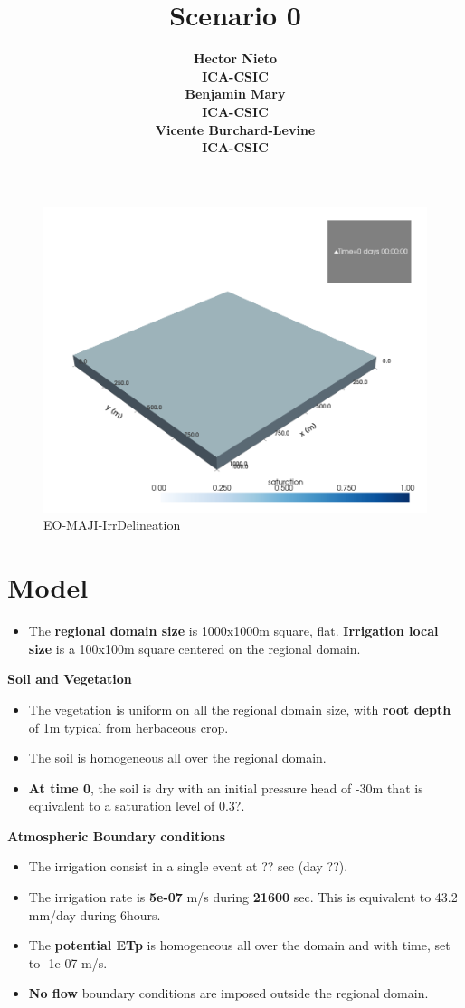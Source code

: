 \documentclass{article}
\title{Scenario 0}
\date{\displaydate{articleDate}}
\author{\bfseries Hector Nieto\mdseries\\ICA-CSIC\\\AND\bfseries Benjamin Mary\mdseries\\ICA-CSIC\\\AND\bfseries Vicente Burchard-Levine\mdseries\\ICA-CSIC\\}
\begin{document}
\maketitle
{}

\begin{figure}[!htbp]
\centering
\includegraphics[width=0.75\linewidth]{files/EOMAJI_mesh-509781dd4b086cb32383299dabc9f88d.png}
\caption*{EO-MAJI-IrrDelineation}
\end{figure}

\section{Model}

\begin{itemize}
\item The \textbf{regional domain size} is 1000x1000m square, flat. \textbf{Irrigation local size} is a 100x100m square centered on the regional domain.
\end{itemize}

\textbf{Soil and Vegetation}

\begin{itemize}
\item The vegetation is uniform on all the regional domain size, with \textbf{root depth} of 1m typical from herbaceous crop.
\item The soil is homogeneous all over the regional domain.
\item \textbf{At time 0}, the soil is dry with an initial pressure head of -30m that is equivalent to a saturation level of 0.3?.
\end{itemize}

\textbf{Atmospheric Boundary conditions}

\begin{itemize}
\item The irrigation consist in a single event at ?? sec (day ??).
\item The irrigation rate is \textbf{5e-07} m/s during \textbf{21600} sec. This is equivalent to 43.2 mm/day during 6hours.
\item The \textbf{potential ETp} is homogeneous all over the domain and with time, set to -1e-07 m/s.
\item \textbf{No flow} boundary conditions are imposed outside the regional domain.
\end{itemize}
\end{document}
